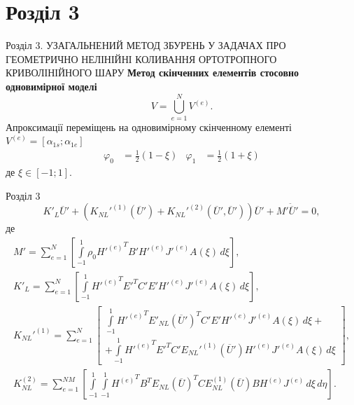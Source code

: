 \documentclass[handout, 8pt]{beamer}
\numberwithin{figure}{section}
\numberwithin{equation}{section}
\numberwithin{table}{section}
\begin{document}
\section{Розділ 3}
\begin{frame}{Розділ 3. УЗАГАЛЬНЕНИЙ МЕТОД ЗБУРЕНЬ У ЗАДАЧАХ ПРО ГЕОМЕТРИЧНО НЕЛІНІЙНІ КОЛИВАННЯ ОРТОТРОПНОГО КРИВОЛІНІЙНОГО ШАРУ}
\textbf{Метод скінченних елементів стосовно одновимірної моделі}
\\
\vspace{1em}
\begin{equation}
V=\bigcup\limits_{e=1}^{N} V^{(e)}.
\end{equation}
Апроксимації переміщень на одновимірному скінченному елементі $V^{(e)} = [\alpha_{1s};\alpha_{1e}]$
\begin{equation}
\begin{aligned}
\varphi_0&=\frac{1}{2}\left(1-\xi\right) & \varphi_1 &=\frac{1}{2}\left(1+\xi\right)
\end{aligned}
\end{equation}
де $\xi \in [-1;1]$.
\end{frame}

\begin{frame}{Розділ 3}
\begin{equation}\label{eq:ode_fem}
K'_L\overline{U}'+\left( K_{NL}'^{(1)}\left( \overline{U}'\right)+K_{NL}'^{(2)}\left( \overline{U}',\overline{U}'\right) \right)\overline{U}'+M'\ddot{\overline{U}}'=0,
\end{equation}
де 
\begin{gather}
M'=\sum_{e=1}^{N}
\left[ \int\limits_{-1}^{1} \rho_0 {H'^{(e)}}^T B' H'^{(e)} J'^{(e)} A\left(\xi\right) \, d\xi \right],\\
K'_L=\sum_{e=1}^{N}
\left[ \int\limits_{-1}^{1}{H'^{(e)}}^T E'^T C' E' H'^{(e)} J'^{(e)} A\left(\xi\right) \, d\xi \right],\\
K_{NL}'^{(1)}=\sum_{e=1}^{N}
\left[ 
\begin{aligned}
\int\limits_{-1}^{1} {H'^{(e)}}^T E'_{NL}\left( \overline{U}'\right)^T C' E' H'^{(e)} J'^{(e)} A\left(\xi\right) \, d\xi  + \\ 
+ \int\limits_{-1}^{1} {H'^{(e)}}^T E'^T C' E_{NL}'^{(1)}\left( \overline{U}'\right) H'^{(e)} J'^{(e)} A\left(\xi\right) \, d\xi 
\end{aligned} 
\right],\\
K_{NL}^{(2)}=\sum_{e=1}^{NM}
\left[ 
\int\limits_{-1}^{1} \int\limits_{-1}^{1} {H^{(e)}}^T B^T E_{NL}\left( \overline{U}\right)^T C E_{NL}^{(1)}\left( \overline{U}\right) B H^{(e)} J^{(e)} \, d\xi \, d\eta 
\right].
\end{gather}

\end{frame}
\end{document}

